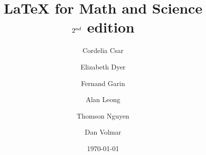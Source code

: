 \documentclass[oneside]{memoir}
\begin{document}
\garamond
\title{\LaTeX{} for Math and Science\\ \small{$2^{{\textrm nd}}$ edition}} 
\author{Cordelia Csar \and
  Elizabeth Dyer \and Fernand Garin \and Alan Leong \and Thomson
  Nguyen \and Dan Volmar} 
\date{\today}
\normalfont
\maketitle
\newpage
\tableofcontents
\newpage
\listoftables
\newpage
\mainmatter











\appendix
\appendixpage






\backmatter
\end{document}
